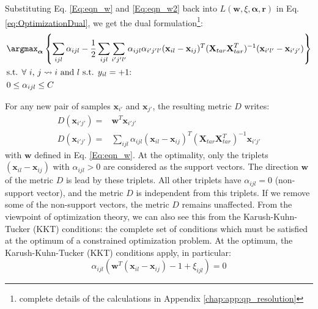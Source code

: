 \noindent Substituting Eq. \ref{Eq:eqn_w} and \ref{Eq:eqn_w2} back into $L(\textbf{w},\xi,\boldsymbol{\alpha},\textbf{r})$ in Eq. \ref{eq:OptimizationDual}, we get the dual formulation\footnote{complete details of the calculations in Appendix \ref{chap:app:qp_resolution}}:
\begin{align}
	&\displaystyle \argmax_{\boldsymbol{\alpha}} \left\lbrace 
	\sum\limits_{ijl} \alpha_{ijl} 
	- \frac{1}{2} \sum\limits_{ijl} \sum\limits_{i'j'l'}
	\alpha_{ijl} \alpha_{i'j'l'}
	(\textbf{x}_{il}-\textbf{x}_{ij})^T
	(\textbf{X}_{tar} \textbf{X}_{tar}^T)^{-1}
	(\textbf{x}_{i'l'}-\textbf{x}_{i'j'}) \right\rbrace \label{eq:OptimDual} \\
	&\text{s.t. $\forall$ $i$, $j \rightsquigarrow i$ and $l$ s.t. $y_{il}=+1$:} \nonumber \\
	& 0 \leq \alpha_{ijl} \leq C
	\label{eq:OptimDualconstraint}
\end{align}

\noindent For any new pair of samples $\textbf{x}_{i'}$ and $\textbf{x}_{j'}$, the resulting metric $D$ writes: 
\begin{align}
	D(\textbf{x}_{i'j'}) = & \textbf{w}^T \textbf{x}_{i'j'} \label{eq:D1} \\
	D(\textbf{x}_{i'j'}) = & \sum\limits_{ijl} \alpha_{ijl} 
	(\textbf{x}_{il}-\textbf{x}_{ij})^T
	(\textbf{X}_{tar}\textbf{X}_{tar}^T)^{-1}
	\textbf{x}_{i'j'}
	\label{eq:D1_2}
\end{align}
with $\textbf{w}$ defined in Eq. \ref{Eq:eqn_w}. At the optimality, only the triplets $(\textbf{x}_{il}-\textbf{x}_{ij})$ with $\alpha_{ijl} > 0$ are considered as the support vectors. The direction $\textbf{w}$ of the metric $D$ is lead by these triplets. All other triplets have $\alpha_{ijl} = 0$ (non-support vector), and the metric $D$ is independent from this triplets. If we remove some of the non-support vectors, the metric $D$ remains unaffected. From the viewpoint of optimization theory, we can also see this from the Karush-Kuhn-Tucker (KKT) conditions: the complete set of conditions which must be satisfied at the optimum of a constrained optimization problem. At the optimum, the Karush-Kuhn-Tucker (KKT) conditions apply, in particular:
\begin{equation*}
	\alpha_{ijl} (\textbf{w}^T (\textbf{x}_{il}-\textbf{x}_{ij}) - 1 + \xi_{ijl}) = 0
\end{equation*}

